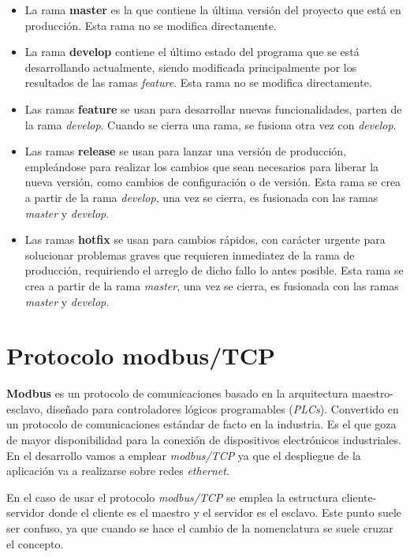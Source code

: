 \documentclass[pdftex,11pt,a4paper]{book}
\begin{document}
\begin{itemize}
\item La rama \textbf{master} es la que contiene la última versión del proyecto que está en producción. Esta rama no se modifica directamente.

\item La rama \textbf{develop} contiene el último estado del programa que se está desarrollando actualmente, siendo modificada principalmente por los resultados de las ramas \emph{feature}. Esta rama no se modifica directamente.

\item Las ramas \textbf{feature} se usan para desarrollar nuevas funcionalidades, parten de la rama \textit{develop}. Cuando se cierra una rama, se fusiona otra vez con \textit{develop}.

\item Las ramas \textbf{release} se usan para lanzar una versión de producción, empleándose para realizar los cambios que sean necesarios para liberar la nueva versión, como cambios de configuración o de versión. Esta rama se crea a partir de la rama \textit{develop}, una vez se cierra, es fusionada con las ramas \textit{master} y \textit{develop}.

\item Las ramas \textbf{hotfix} se usan para cambios rápidos, con carácter urgente para solucionar problemas graves que requieren inmediatez de la rama de producción, requiriendo el arreglo de dicho fallo lo antes posible. Esta rama se crea a partir de la rama \textit{master}, una vez se cierra, es fusionada con las ramas \textit{master} y \textit{develop}.
\end{itemize}

\section{Protocolo modbus/TCP}

\textbf{Modbus}  \cite{modbus} es un protocolo de comunicaciones basado en la arquitectura maestro-esclavo, diseñado para controladores lógicos programables (\emph{PLCs}). Convertido en un protocolo de comunicaciones estándar de facto en la industria. Es el que goza de mayor disponibilidad para la conexión de dispositivos electrónicos industriales. En el desarrollo vamos a emplear \emph{modbus/TCP} ya que el despliegue de la aplicación va a realizarse sobre redes \emph{ethernet}.

En el caso de usar el protocolo \emph{modbus/TCP} se emplea la estructura cliente-servidor donde el cliente es el maestro y el servidor es el esclavo. Este punto suele ser confuso, ya que cuando se hace el cambio de la nomenclatura se suele cruzar el concepto.
\end{document}

